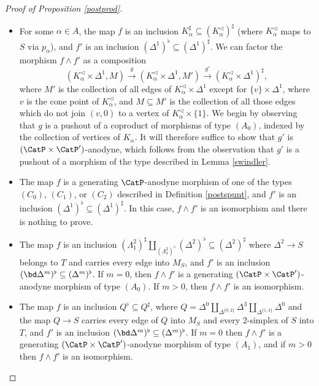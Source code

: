 \begin{proof}[Proof of Proposition \ref{postprod}]
\begin{itemize}
\item[$(B_1)$] For some $\alpha \in A$, the map $f$ is an inclusion
$K_{\alpha}^{\sharp} \subseteq
(K_{\alpha}^{\triangleleft})^{\sharp}$ (where $K_{\alpha}^{\triangleleft}$ maps to $S$ via
$p_{\alpha}$), and $f'$ is an inclusion
$(\Delta^1)^{\flat} \subseteq (\Delta^1)^{\sharp}$. We can factor the morphism
$f \wedge f'$ as a composition
$$ ( K_{\alpha}^{\triangleleft} \times \Delta^1, M) \stackrel{g}{\rightarrow}
(K_{\alpha}^{\triangleleft} \times \Delta^1, M') \stackrel{g'}{\rightarrow}
(K_{\alpha}^{\triangleleft} \times \Delta^1)^{\sharp},$$
where $M'$ is the collection of all edges of $K_{\alpha}^{\triangleleft} \times \Delta^1$
except for $\{v\} \times \Delta^1$, where $v$ is the cone point of $K_{\alpha}^{\triangleleft}$, and
$M \subseteq M'$ is the collection of all those edges which do not join $(v, 0)$ to
a vertex of $K_{\alpha}^{\triangleleft} \times \{1\}$. We begin by observing that $g$ is a pushout of a
coproduct of morphisms of type $(A_0)$, indexed by the collection of vertices of $K_{\alpha}$.
It will therefore suffice to show that $g'$ is $(\CatP \times \CatP')$-anodyne, which follows from
the observation that $g'$ is a pushout of a morphism of the type described in Lemma \ref{swindler}.

\item[$(C)$] The map $f$ is a generating $\CatP$-anodyne morphism of one of the types
$(C_0)$, $(C_1)$, or $(C_2)$ described in Definition \ref{postspunt}, and $f'$ is an inclusion
$(\Delta^1)^{\flat} \subseteq (\Delta^1)^{\sharp}$. In this case, $f \wedge f'$ is an isomorphism and there is nothing to prove.

\item[$(A'_0)$] The map $f$ is an inclusion $( \Lambda^2_1)^{\sharp} \coprod_{ (\Lambda^2_{1})^{\flat}} (\Delta^2)^{\flat}  \subseteq (\Delta^2)^{\sharp}$ where $\Delta^2 \rightarrow S$ belongs to
$T$ and carries every edge into $M_S$, and $f'$ is an inclusion
$(\bd \Delta^m)^{\flat} \subseteq (\Delta^m)^{\flat}$. If $m=0$, then $f \wedge f'$ is a
generating $(\CatP \times \CatP')$-anodyne morphism of type $(A_0)$. If $m > 0$, then
$f \wedge f'$ is an isomorphism.

\item[$(A'_1)$] The map $f$ is an inclusion $Q^{\flat} \subseteq Q^{\sharp}$, where
$Q = \Delta^0 \coprod_{ \Delta^{ \{0,2\} }} \Delta^3 \coprod_{ \Delta^{ \{1,3\} }} \Delta^0$
and the map $Q \rightarrow S$ carries every edge of $Q$ into $M_S$ and every $2$-simplex
of $S$ into $T$, and $f'$ is an inclusion
$(\bd \Delta^m)^{\flat} \subseteq (\Delta^m)^{\flat}$. If $m=0$ then $f \wedge f'$ is
a generating $(\CatP \times \CatP')$-anodyne morphism of type $(A_1)$, and if
$m > 0$ then $f \wedge f'$ is an isomorphism.


\end{itemize}
\end{proof}
